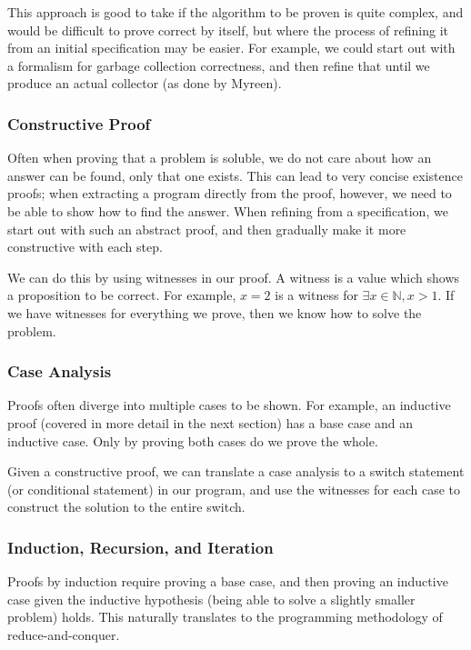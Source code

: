 This approach is good to take if the algorithm to be proven is quite
complex, and would be difficult to prove correct by itself, but where
the process of refining it from an initial specification may be
easier. For example, we could start out with a formalism for garbage
collection correctness, and then refine that until we produce an
actual collector (as done by Myreen\cite{Myreen10}).

\subsubsection{Constructive Proof}
\label{sec:lit-verification-extraction-constructive}

Often when proving that a problem is soluble, we do not care about how
an answer can be found, only that one exists. This can lead to very
concise existence proofs; when extracting a program directly from the
proof, however, we need to be able to show how to find the
answer. When refining from a specification, we start out with such an
abstract proof, and then gradually make it more constructive with each
step.

We can do this by using witnesses in our proof. A witness is a value
which shows a proposition to be correct. For example, $x = 2$ is a
witness for $\exists x \in \mathbb N, x > 1$. If we have witnesses for
everything we prove, then we know how to solve the problem.

\subsubsection{Case Analysis}
\label{sec:lit-verification-extraction-cases}

Proofs often diverge into multiple cases to be shown. For example, an
inductive proof (covered in more detail in the next section) has a
base case and an inductive case. Only by proving both cases do we
prove the whole.

Given a constructive proof, we can translate a case analysis to a
switch statement (or conditional statement) in our program, and use
the witnesses for each case to construct the solution to the entire
switch.

\subsubsection{Induction, Recursion, and Iteration}
\label{sec:lit-verification-extraction-induction}

Proofs by induction require proving a base case, and then proving an
inductive case given the inductive hypothesis (being able to solve a
slightly smaller problem) holds. This naturally translates to the
programming methodology of reduce-and-conquer.

